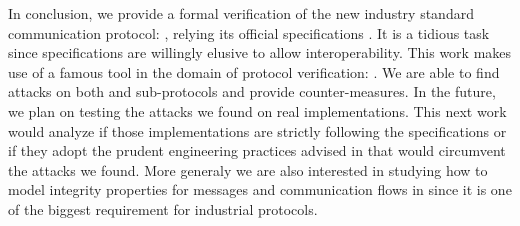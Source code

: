 In conclusion, we provide a formal verification of the new industry standard
communication protocol: \opcua, relying its official specifications
\cite{MLD09,opcua_part2,opcua_part4,opcua_part6}.
It is a tidious task since specifications are willingly elusive to allow
interoperability.
This work makes use of a famous tool in the domain of protocol verification:
\proverif.
We are able to find attacks on both \securechan and \session sub-protocols and
provide counter-measures.
In the future, we plan on testing the attacks we found on real implementations.
This next work would analyze if those implementations are strictly following
the specifications or if they adopt the prudent engineering practices advised in
\cite{} that would circumvent the attacks we found.
More generaly we are also interested in studying how to model integrity
properties for messages and communication flows in \proverif since it is one of
the biggest requirement for industrial protocols.
